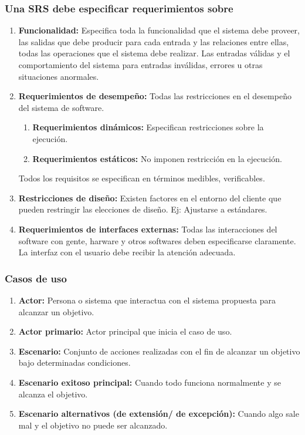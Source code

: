     \subsubsection{Una SRS debe especificar requerimientos sobre}
    \begin{enumerate}
      \item \textbf{Funcionalidad:} Especifica toda la funcionalidad que el sistema debe proveer, las salidas que debe
        producir para cada entrada y las relaciones entre ellas, todas las operaciones que el sistema debe realizar. Las
        entradas válidas y el comportamiento del sistema para entradas inválidas, errores u otras situaciones anormales.
      \item \textbf{Requerimientos de desempeño:} Todas las restricciones en el desempeño del sistema de software.
            \begin{enumerate}[-]
              \item \textbf{Requerimientos dinámicos:} Especifican restricciones sobre la ejecución.
              \item \textbf{Requerimientos estáticos:} No imponen restricción en la ejecución.
            \end{enumerate}
            Todos los requisitos se especifican en términos medibles, verificables.
      \item \textbf{Restricciones de diseño:} Existen factores en el entorno del cliente que pueden restringir las
        elecciones de diseño. Ej: Ajustarse a estándares.
      \item \textbf{Requerimientos de interfaces externas:} Todas las interacciones del software con gente, harware y
        otros softwares deben especificarse claramente. La interfaz con el usuario debe recibir la atención adecuada.
    \end{enumerate}

    \subsubsection{Casos de uso}

    \PN{}
    \begin{enumerate}[-]
      \item \textbf{Actor:} Persona o sistema que interactua con el sistema propuesta para alcanzar un objetivo.
      \item \textbf{Actor primario:} Actor principal que inicia el caso de uso.
      \item \textbf{Escenario:} Conjunto de acciones realizadas con el fin de alcanzar un objetivo bajo determinadas
        condiciones.
      \item \textbf{Escenario exitoso principal:} Cuando todo funciona normalmente y se alcanza el objetivo.
      \item \textbf{Escenario alternativos (de extensión/ de excepción):} Cuando algo sale mal y el objetivo no puede
        ser alcanzado.
    \end{enumerate}

